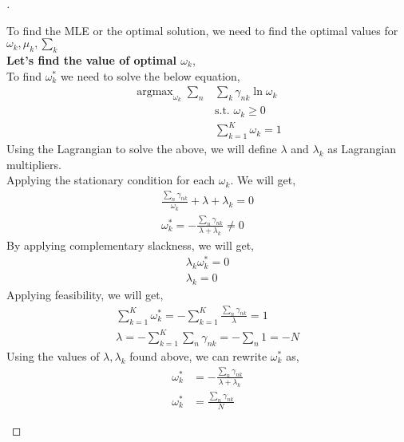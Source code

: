 \documentclass[a4paper, 12pt]{article}
\DeclareMathOperator*{\argmax}{argmax}
\begin{document}
\begin{proof}[]
\begin{enumerate}[label={\color{blue}{\textbf{1.\arabic*})}}]
        To find the MLE or the optimal solution, we need to find the optimal values for $\omega_k, \mu_k, \textstyle\sum_k $\\
        \textbf{Let's find the value of optimal $\omega_k$},\\
        To find $\omega_k^*$ we need to solve the below equation, 
        \begin{align*}
            \argmax_{\omega_k} \sum\limits_{n} &\sum\limits_{k} \gamma_{nk} \ln{\omega_k} \\
           &\text{s.t. } \omega_k \geq 0\\ &\sum\limits_{k=1}^{K}\omega_k = 1
        \end{align*}
        Using the Lagrangian to solve the above, we will define $\lambda$ and $\lambda_k$ as Lagrangian multipliers.\\
        Applying the stationary condition for each $\omega_k$. We will get,
        \begin{align*}
            \frac{\textstyle\sum_n\gamma_{nk}}{\omega_k} + \lambda + \lambda_k = 0\\
            \omega_k^* = -\frac{\textstyle\sum_n\gamma_{nk}}{\lambda + \lambda_k} \neq 0
        \end{align*}
        By applying complementary slackness, we will get, 
        \begin{align*}
            \lambda_k\omega_k^* = 0\\
            \lambda_k = 0
        \end{align*}
        Applying feasibility, we will get, 
        \begin{align*}
            \sum\limits_{k=1}^{K}\omega_k^* = -\sum\limits_{k=1}^{K}\frac{\textstyle\sum_n\gamma_{nk}}{\lambda} = 1\\
            \lambda = -\sum\limits_{k=1}^{K}\sum_n\gamma_{nk} = -\textstyle\sum_n 1 = -N
        \end{align*}
        Using the values of $\lambda, \lambda_k$ found above, we can rewrite $\omega_k^*$ as,
        \begin{align*}
            \omega_k^* &= -\frac{\textstyle\sum_n\gamma_{nk}}{\lambda + \lambda_k} \\
            \omega_k^* &= \frac{\textstyle\sum_n\gamma_{nk}}{N}
        \end{align*}
        

\end{enumerate}
\end{proof}
\end{document}

